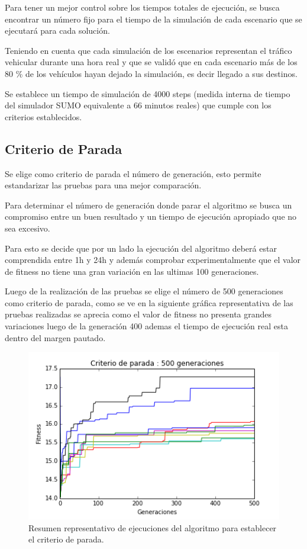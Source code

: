 Para tener un mejor control sobre los tiempos totales de ejecución, se busca encontrar un número fijo para el tiempo de la simulación de cada escenario que se ejecutará para cada solución.

Teniendo en cuenta que cada simulación de los escenarios representan el tráfico vehicular durante una hora real y que se validó que en cada escenario más de los 80 \% de los vehículos hayan dejado la simulación, es decir llegado a sus destinos.

Se establece un tiempo de simulación de 4000 steps (medida interna de tiempo del simulador SUMO equivalente a 66 minutos reales) que cumple con los criterios establecidos. 

\subsection{Criterio de Parada}
Se elige como criterio de parada el número de generación, esto permite estandarizar las pruebas para una mejor comparación.

Para determinar el número de generación donde parar el algoritmo se busca un compromiso entre un buen resultado y un tiempo de ejecución apropiado que no sea excesivo.

Para esto se decide que por un lado la ejecución del algoritmo deberá estar comprendida entre 1h y 24h y además comprobar experimentalmente que el valor de fitness no tiene una gran variación en las ultimas 100 generaciones.

Luego de la realización de las pruebas se elige el número de 500 generaciones como criterio de parada, como se ve en la siguiente gráfica representativa de las pruebas realizadas se aprecia como el valor de fitness no presenta grandes variaciones luego de la generación 400 ademas el tiempo de ejecución real esta dentro del margen pautado.




\begin{figure}[h]
\centering
\includegraphics[width=0.7\linewidth]{Figures/criterio_parada}
\caption{Resumen representativo de ejecuciones del algoritmo para establecer el criterio de parada.}
\label{fig:criterio_parada}
\end{figure}



